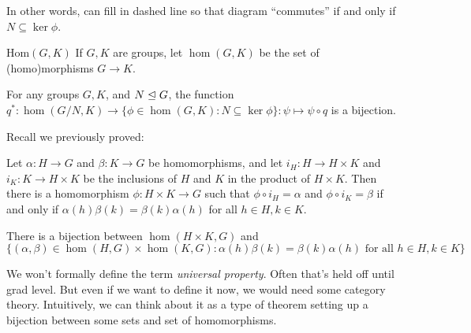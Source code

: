 In other words, can fill in dashed line so that diagram ``commutes'' if and only if $N\subseteq \ker \phi$.

\begin{notation}{Hom$(G,K)$}
If $G,K$ are groups, let \textbf{$\hom(G,K)$} be the set of (homo)morphisms $G\to K$.
\end{notation}

\begin{corr}
For any groups $G,K$, and $N\trianglelefteq G$, the function $q^*:\hom(G/N,K)\to \{\phi\in\hom (G,K):N\subseteq \ker \phi\}:\psi\mapsto \psi\circ q$ is a bijection.
\end{corr}

Recall we previously proved:
\begin{thm}
Let $\alpha:H\to G$ and $\beta:K\to G$ be homomorphisms, and let $i_H:H\to H\times K$ and $i_K:K\to H\times K$ be the inclusions of $H$ and $K$ in the product of $H\times K$. Then there is a homomorphism $\phi:H\times K\to G$ such that $\phi\circ i_H=\alpha$ and $\phi\circ i_K=\beta $ if and only if $\alpha(h)\beta(k)=\beta(k)\alpha(h)$ for all $h\in H, k\in K$.
\end{thm}

\begin{center}
\end{center}

\begin{corr}
There is a bijection between $\hom(H\times K,G)$ and $$\{(\alpha,\beta)\in \hom(H,G)\times \hom(K,G):\alpha(h)\beta(k)=\beta(k)\alpha(h) \text{ for all }h\in H,k\in K \}$$
\end{corr}

\begin{remark}
We won't formally define the term \textit{universal property}. Often that's held off until grad level. But even if we want to define it now, we would need some category theory. Intuitively, we can think about it as a type of theorem setting up a bijection between some sets and set of homomorphisms.
\end{remark}

